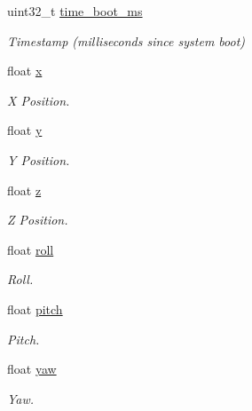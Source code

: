 \begin{DoxyCompactItemize}
\item 
uint32\+\_\+t \hyperlink{struct____mavlink__local__position__ned__system__global__offset__t_a7da6dfcadb9fe7e050d067ab139600c4}{time\+\_\+boot\+\_\+ms}
\begin{DoxyCompactList}\small\item\em Timestamp (milliseconds since system boot) \end{DoxyCompactList}\item 
float \hyperlink{struct____mavlink__local__position__ned__system__global__offset__t_a35ab546f47a443131ccd805126ae9ca1}{x}
\begin{DoxyCompactList}\small\item\em X Position. \end{DoxyCompactList}\item 
float \hyperlink{struct____mavlink__local__position__ned__system__global__offset__t_a475a296670eca737a98ff9c89f8289f8}{y}
\begin{DoxyCompactList}\small\item\em Y Position. \end{DoxyCompactList}\item 
float \hyperlink{struct____mavlink__local__position__ned__system__global__offset__t_a39ca4444559388d75cb066b14db24a4b}{z}
\begin{DoxyCompactList}\small\item\em Z Position. \end{DoxyCompactList}\item 
float \hyperlink{struct____mavlink__local__position__ned__system__global__offset__t_ad4d99c9821f0ee3d85c2a0eba615a8c8}{roll}
\begin{DoxyCompactList}\small\item\em Roll. \end{DoxyCompactList}\item 
float \hyperlink{struct____mavlink__local__position__ned__system__global__offset__t_abf94231c7acd5e41896e5fdf98cd0128}{pitch}
\begin{DoxyCompactList}\small\item\em Pitch. \end{DoxyCompactList}\item 
float \hyperlink{struct____mavlink__local__position__ned__system__global__offset__t_a2a919917ced7545167d6f588d6c8f0ef}{yaw}
\begin{DoxyCompactList}\small\item\em Yaw. \end{DoxyCompactList}\end{DoxyCompactItemize}


